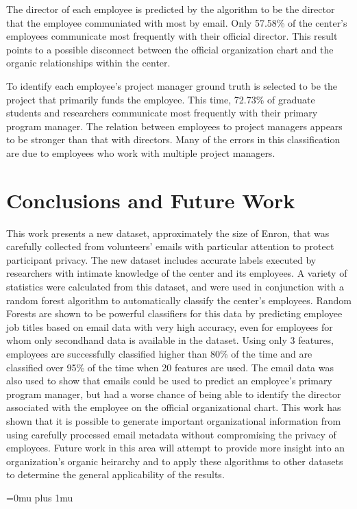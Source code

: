 \documentclass{article}
\begin{document}
The director of each employee is predicted by the algorithm to be the director that the employee communiated with most by email.  Only 57.58\% of the center's employees communicate most frequently with their official director.   This result points to a possible disconnect between the official organization chart and the organic relationships within the center.

To identify each employee's project manager ground truth is selected to be the project that primarily funds the employee.  This time, 72.73\% of graduate students and researchers communicate most frequently with their primary program manager.  The relation between employees to project managers appears to be stronger than that with directors.  Many of the errors in this classification are due to employees who work with multiple project managers.  

\section{Conclusions and Future Work} \label{Conclusions}
This work presents a new dataset, approximately the size of Enron, that was carefully collected from volunteers' emails with particular attention to protect participant privacy.  The new dataset includes accurate labels executed by researchers with intimate knowledge of the center and its employees.  A variety of statistics were calculated from this dataset, and were used in conjunction with a random forest algorithm to automatically classify the center's employees.  Random Forests are shown to be powerful classifiers for this data by predicting employee job titles based on email data with very high accuracy, even for employees for whom only secondhand data is available in the dataset.  Using only 3 features, employees are successfully classified higher than 80\% of the time and are classified over 95\% of the time when 20 features are used.  The email data was also used to show that emails could be used to predict an employee's primary program manager, but had a worse chance of being able to identify the director associated with the employee on the official organizational chart.  This work has shown that it is possible to generate important organizational information from using carefully processed email metadata without compromising the privacy of employees.  Future work in this area will attempt to provide more insight into an organization's organic heirarchy and to apply these algorithms to other datasets to determine the general applicability of the results.

\clearpage
\Urlmuskip=0mu plus 1mu\relax


\end{document}
